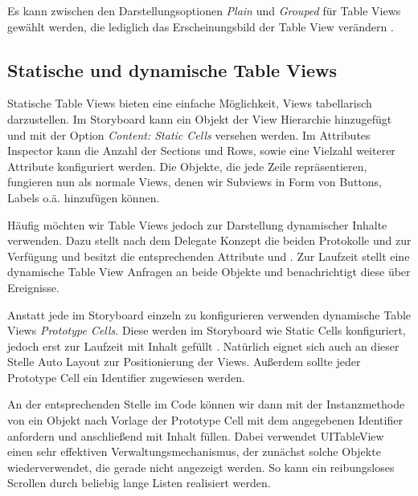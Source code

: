 \documentclass[parskip=half, final]{scrreprt}
\begin{document}
Es kann zwischen den Darstellungsoptionen \emph{Plain} und \emph{Grouped} für Table Views gewählt werden, die lediglich das Erscheinungsbild der Table View verändern .


\subsection{Statische und dynamische Table Views}

Statische Table Views bieten eine einfache Möglichkeit, Views tabellarisch darzustellen. Im Storyboard kann ein  Objekt der View Hierarchie hinzugefügt und mit der Option \emph{Content: Static Cells} versehen werden. Im Attributes Inspector kann die Anzahl der Sections und Rows, sowie eine Vielzahl weiterer Attribute konfiguriert werden. Die  Objekte, die jede Zeile repräsentieren, fungieren nun als normale Views, denen wir Subviews in Form von Buttons, Labels o.ä. hinzufügen können.

Häufig möchten wir Table Views jedoch zur Darstellung dynamischer Inhalte verwenden. Dazu stellt  nach dem Delegate Konzept die beiden Protokolle  und  zur Verfügung und besitzt die entsprechenden Attribute  und . Zur Laufzeit stellt eine dynamische Table View Anfragen an beide Objekte und benachrichtigt diese über Ereignisse.

Anstatt jede  im Storyboard einzeln zu konfigurieren verwenden dynamische Table Views \emph{Prototype Cells}. Diese werden im Storyboard wie Static Cells konfiguriert, jedoch erst zur Laufzeit mit Inhalt gefüllt . Natürlich eignet sich auch an dieser Stelle Auto Layout zur Positionierung der Views. Außerdem sollte jeder Prototype Cell ein Identifier zugewiesen werden.


An der entsprechenden Stelle im Code können wir dann mit der Instanzmethode  von  ein  Objekt nach Vorlage der Prototype Cell mit dem angegebenen Identifier anfordern und anschließend mit Inhalt füllen. Dabei verwendet UITableView einen sehr effektiven Verwaltungsmechanismus, der zunächst solche  Objekte wiederverwendet, die gerade nicht angezeigt werden. So kann ein reibungsloses Scrollen durch beliebig lange Listen realisiert werden.
\end{document}
